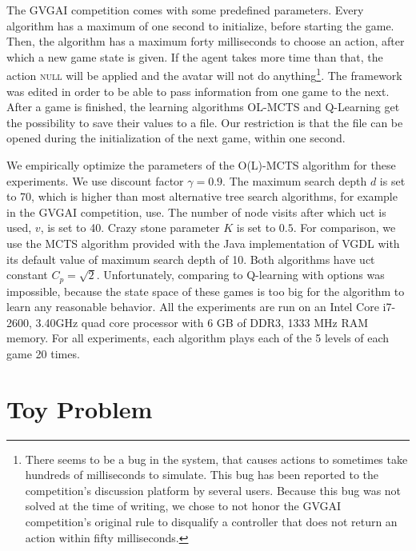 The GVGAI competition comes with some predefined parameters. Every algorithm has
a maximum of one second to initialize, before starting the game. Then, the
algorithm has a maximum forty milliseconds to choose an action, after which a
new game state is given. If the agent takes more time than that, the action
\textsc{null} will be applied and the avatar will not do anything\footnote{There
seems to be a bug in the system, that causes actions to sometimes take hundreds
of milliseconds to simulate. This bug has been reported to the competition's
discussion platform by several users. Because this bug was not solved at the
time of writing, we chose to not honor the GVGAI competition's original rule to
disqualify a controller that does not return an action within fifty
milliseconds.}. The framework was edited in order to be able to pass information
from one game to the next. After a game is finished, the learning algorithms
OL-MCTS and Q-Learning get the possibility to save their values to a file. Our
restriction is that the file can be opened during the initialization of the next
game, within one second. 

We empirically optimize the parameters of the O(L)-MCTS algorithm for these
experiments. We use discount factor $\gamma = 0.9$. The maximum search depth $d$
is set to 70, which is higher than most alternative tree search algorithms, for
example in the GVGAI competition, use. The number of node visits after which
\textsf{uct} is used, $v$, is set to 40. Crazy stone parameter $K$ is set to
$0.5$.  For comparison, we use the MCTS algorithm provided with the Java
implementation of VGDL with its default value of maximum search depth of 10.
Both algorithms have \textsf{uct} constant $C_p = \sqrt{2}$. Unfortunately,
comparing to Q-learning with options was impossible, because the state space of
these games is too big for the algorithm to learn any reasonable behavior. All
the experiments are run on an Intel %
Core %
i7-2600, 3.40GHz quad core processor with 6 GB of DDR3, 1333 MHz RAM memory. For
all experiments, each algorithm plays each of the 5 levels of each game 20
times. 

\section{Toy Problem}



